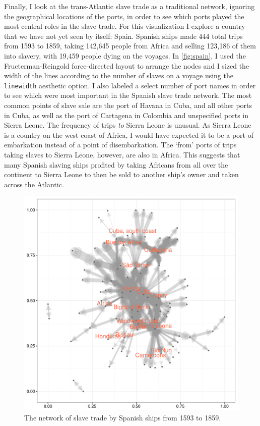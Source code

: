 \documentclass[DIV=calc, paper=a4, fontsize=10pt, twocolumn]{scrartcl}\usepackage[]{graphicx}\usepackage[]{color}
\makeatletter
\def\maxwidth{ %
  \ifdim\Gin@nat@width>\linewidth
    \linewidth
  \else
    \Gin@nat@width
  \fi
}
\newenvironment{knitrout}{}{} %
\makeatother
\begin{document}
\par Finally, I look at the trans-Atlantic slave trade as a traditional network, ignoring the geographical locations of the ports, in order to see which ports played the most central roles in the slave trade. For this visualization I explore a country that we have not yet seen by itself: Spain. Spanish ships made 444 total trips from 1593 to 1859, taking 142,645 people from Africa and selling 123,186 of them into slavery, with 19,459 people dying on the voyages. In \autoref{fig:spain}, I used the Fructerman-Reingold force-directed layout to arrange the nodes and I sized the width of the lines according to the number of slaves on a voyage using the \texttt{linewidth} aesthetic option.%
I also labeled a select number of port names in order to see which were most important in the Spanish slave trade network.  The most common points of slave sale are the port of Havana in Cuba, and all other ports in Cuba, as well as the port of Cartagena in Colombia and unspecified ports in Sierra Leone. The frequency of trips \emph{to} Sierra Leone is unusual. As Sierra Leone is a country on the west coast of Africa, I would have expected it to be a port of embarkation instead of a point of disembarkation. The `from' ports of trips taking slaves to Sierra Leone, however, are also in Africa. This suggests that many Spanish slaving ships profited by taking Africans from all over the continent to Sierra Leone to then be sold to another ship's owner and taken across the Atlantic. 

\begin{knitrout}
\color{fgcolor}\begin{figure}[h]
\includegraphics[width=\maxwidth]{figure/spain-1} \caption[The network of slave trade by Spanish ships from 1593 to 1859]{The network of slave trade by Spanish ships from 1593 to 1859.}\label{fig:spain}
\end{figure}


\end{knitrout}
\end{document}
